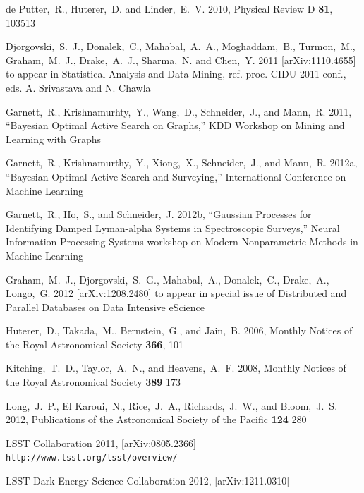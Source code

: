 \documentclass[prd, nofootinbib, floatfix, 12pt,tightenlines]{revtex4}
\begin{document}
\begin{thebibliography}{99}
de Putter,~R., Huterer,~D. and Linder,~E.~V. 2010, Physical Review D {\bf 81},
103513


Djorgovski,~S.~J., Donalek,~C., Mahabal,~A.~A., Moghaddam,~B., Turmon,~M.,
Graham,~M.~J., Drake,~A.~J., Sharma,~N. and Chen,~Y. 2011
[arXiv:1110.4655] to appear in Statistical Analysis and Data Mining, ref. proc.
CIDU 2011 conf., eds. A. Srivastava and N. Chawla

Garnett,~R., Krishnamurhty,~Y., Wang,~D., Schneider,~J., and Mann,~R. 2011,
``Bayesian Optimal Active Search on Graphs,'' KDD Workshop on Mining and
Learning with Graphs

Garnett,~R., Krishnamurthy,~Y., Xiong,~X., Schneider,~J., and Mann,~R. 2012a,
``Bayesian Optimal Active Search and Surveying,'' International Conference on
Machine Learning

Garnett,~R., Ho,~S., and Schneider,~J. 2012b,
``Gaussian Processes for Identifying Damped Lyman-alpha Systems in Spectroscopic
Surveys,'' Neural Information Processing Systems 
workshop on Modern Nonparametric Methods in Machine Learning

Graham,~M.~J., Djorgovski,~S.~G., Mahabal,~A., Donalek,~C., Drake,~A.,
Longo,~G. 2012 [arXiv:1208.2480] to appear in special issue of Distributed and
Parallel Databases on Data Intensive eScience

Huterer,~D., Takada,~M., Bernstein,~G., and Jain,~B. 2006,
Monthly Notices of the Royal Astronomical Society {\bf 366}, 101

Kitching,~T.~D., Taylor,~A.~N., and Heavens,~A.~F. 2008,
Monthly Notices of the Royal Astronomical Society {\bf 389} 173

Long,~J.~P., El Karoui,~N., Rice,~J.~A., Richards,~J.~W., and Bloom,~J.~S. 2012,
Publications of the Astronomical Society of the Pacific {\bf 124} 280

LSST Collaboration 2011, [arXiv:0805.2366]
\verb|http://www.lsst.org/lsst/overview/|

LSST Dark Energy Science Collaboration 2012, [arXiv:1211.0310]


\end{thebibliography}
\end{document}
